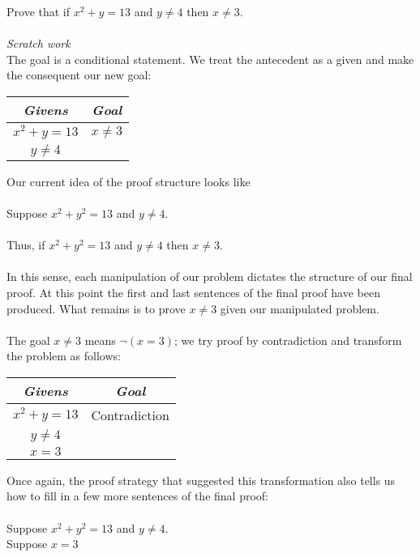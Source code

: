 \documentclass{report}
\theoremstyle{definition}
\begin{document}
Prove that if $x^2+y=13$ and $y\neq4$ then $x\neq3$.\\
\vspace{1mm}\\
\textit{Scratch work}\\
The goal is a conditional statement. We treat the antecedent as a given and make the consequent our new goal:
\begin{center}
\begin{tabular}{c|c}
\textit{Givens}&\textit{Goal}\\
\hline
$x^2+y=13$&$x\neq3$\\
$y\neq4$&
\end{tabular}
\end{center}
Our current idea of the proof structure looks like\\
\vspace{1mm}\\
\indent Suppose $x^2+y^2=13$ and $y\neq4$.\\
\indent{}\\
\indent Thus, if $x^2+y^2=13$ and $y\neq4$ then $x\neq3$.\\
\vspace{1mm}\\
In this sense, each manipulation of our problem dictates the structure of our final proof. At this point the first and last sentences of the final proof have been produced. 
What remains is to prove $x\neq 3$ given our manipulated problem.\\
\vspace{1mm}\\
The goal $x\neq3$ means $\neg(x=3)$; we try proof by contradiction and transform the problem as follows:
\begin{center}
\begin{tabular}{c|c}
\textit{Givens}&\textit{Goal}\\
\hline
$x^2+y=13$&Contradiction\\
$y\neq4$&\\
$x=3$&
\end{tabular}
\end{center}
Once again, the proof strategy that suggested this transformation also tells us how to fill in a few more sentences of the final proof:\\
\vspace{1mm}\\
\indent Suppose $x^2+y^2=13$ and $y\neq4$.\\
\indent\indent Suppose $x=3$\\
\end{document}
